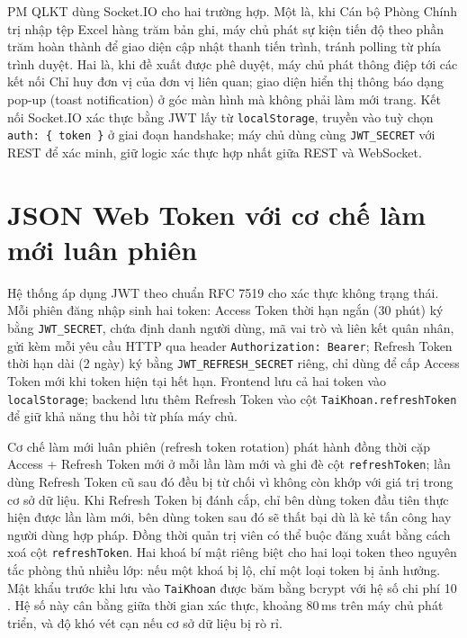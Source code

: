 \documentclass[../DoAn.tex]{subfiles}
\begin{document}
PM QLKT dùng Socket.IO cho hai trường hợp. Một là, khi Cán bộ Phòng Chính trị nhập tệp Excel hàng trăm bản ghi, máy chủ phát sự kiện tiến độ theo phần trăm hoàn thành để giao diện cập nhật thanh tiến trình, tránh polling từ phía trình duyệt. Hai là, khi đề xuất được phê duyệt, máy chủ phát thông điệp tới các kết nối Chỉ huy đơn vị của đơn vị liên quan; giao diện hiển thị thông báo dạng pop-up (toast notification) ở góc màn hình mà không phải làm mới trang. Kết nối Socket.IO xác thực bằng JWT lấy từ \texttt{localStorage}, truyền vào tuỳ chọn \texttt{auth: \{ token \}} ở giai đoạn handshake; máy chủ dùng cùng \texttt{JWT\_SECRET} với REST để xác minh, giữ logic xác thực hợp nhất giữa REST và WebSocket.

\section{JSON Web Token với cơ chế làm mới luân phiên}
\label{section:3.6}

Hệ thống áp dụng JWT theo chuẩn RFC 7519 \cite{rfc7519} cho xác thực không trạng thái. Mỗi phiên đăng nhập sinh hai token: Access Token thời hạn ngắn (30 phút) ký bằng \texttt{JWT\_SECRET}, chứa định danh người dùng, mã vai trò và liên kết quân nhân, gửi kèm mỗi yêu cầu HTTP qua header \texttt{Authorization: Bearer}; Refresh Token thời hạn dài (2 ngày) ký bằng \texttt{JWT\_REFRESH\_SECRET} riêng, chỉ dùng để cấp Access Token mới khi token hiện tại hết hạn. Frontend lưu cả hai token vào \texttt{localStorage}; backend lưu thêm Refresh Token vào cột \texttt{TaiKhoan.refreshToken} để giữ khả năng thu hồi từ phía máy chủ.

Cơ chế làm mới luân phiên (refresh token rotation) phát hành đồng thời cặp Access + Refresh Token mới ở mỗi lần làm mới và ghi đè cột \texttt{refreshToken}; lần dùng Refresh Token cũ sau đó đều bị từ chối vì không còn khớp với giá trị trong cơ sở dữ liệu. Khi Refresh Token bị đánh cắp, chỉ bên dùng token đầu tiên thực hiện được lần làm mới, bên dùng token sau đó sẽ thất bại dù là kẻ tấn công hay người dùng hợp pháp. Đồng thời quản trị viên có thể buộc đăng xuất bằng cách xoá cột \texttt{refreshToken}. Hai khoá bí mật riêng biệt cho hai loại token theo nguyên tắc phòng thủ nhiều lớp: nếu một khoá bị lộ, chỉ một loại token bị ảnh hưởng. Mật khẩu trước khi lưu vào \texttt{TaiKhoan} được băm bằng bcrypt với hệ số chi phí 10 \cite{bcrypt}. Hệ số này cân bằng giữa thời gian xác thực, khoảng 80\,ms trên máy chủ phát triển, và độ khó vét cạn nếu cơ sở dữ liệu bị rò rỉ.
\end{document}
